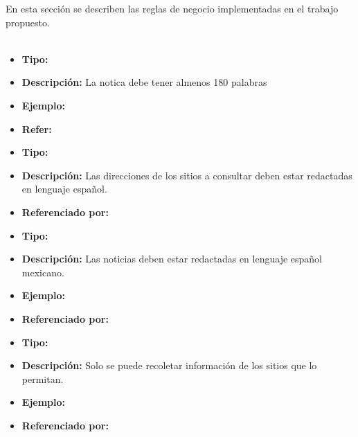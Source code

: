 

En esta sección se describen las reglas de negocio implementadas en el trabajo propuesto.\\\\
\begin{itemize}
  \item \textbf{Tipo:}  
  \item \textbf{Descripción:}  La notica debe tener almenos 180 palabras
  \item \textbf{Ejemplo:}
  \item \textbf{Refer:}
\end{itemize}

\begin{itemize}
  \item \textbf{Tipo:}  
  \item \textbf{Descripción:} Las direcciones de los sitios a consultar deben estar redactadas en lenguaje español.
  \item \textbf{Referenciado por:}  \\
\end{itemize}

\begin{itemize}
  \item \textbf{Tipo:}  
  \item \textbf{Descripción:} Las noticias deben estar redactadas en lenguaje español mexicano.
  \item \textbf{Ejemplo:}
  \item \textbf{Referenciado por:}  \\
\end{itemize}

\begin{itemize}
  \item \textbf{Tipo:}  
  \item \textbf{Descripción:} Solo se puede recoletar información de los sitios que lo permitan.
  \item \textbf{Ejemplo:}
  \item \textbf{Referenciado por:}  \\
\end{itemize}

